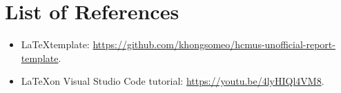 \section{List of References}
\label{sec:list-of-references}

\begin{itemize}
    \item \LaTeX \space template: \url{https://github.com/khongsomeo/hcmus-unofficial-report-template}.
    \item \LaTeX \space on Visual Studio Code tutorial: \url{https://youtu.be/4lyHIQl4VM8}.
\end{itemize}